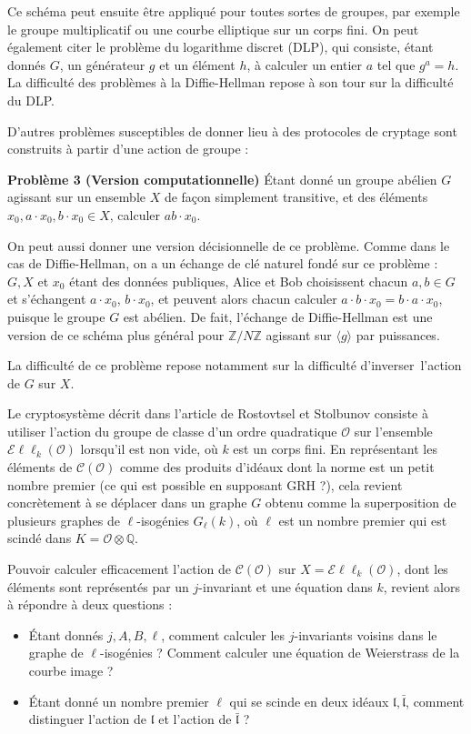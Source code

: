 \documentclass[11pt,a4paper]{article}
\newcommand{\Z}{\mathbb{Z}}
\newcommand{\Q}{\mathbb{Q}}
\renewcommand{\O}{\mathcal{O}}
\newcommand{\Cl}{\mathcal{C}}
\newcommand{\Ell}{\mathcal{E}\ell\ell}
\renewcommand{\frak}{\mathfrak}
\theoremstyle{definition}
\begin{document}
Ce schéma peut ensuite être appliqué pour toutes sortes de groupes, par exemple le groupe multiplicatif ou une courbe elliptique sur un corps fini. On peut également citer le problème du logarithme discret (DLP), qui consiste, étant donnés $G$, un générateur $g$ et un élément $h$, à calculer un entier $a$ tel que $g^a=h$. La difficulté des problèmes à la Diffie-Hellman repose à son tour sur la difficulté du DLP.

\vspace{5mm}

D'autres problèmes susceptibles de donner lieu à des protocoles de cryptage sont construits à partir d'une action de groupe :

\textbf{Problème 3 (Version computationnelle)} \'Etant donné un groupe abélien $G$ agissant sur un ensemble $X$ de façon simplement transitive, et des éléments $x_0, a\cdot x_0, b\cdot x_0\in X$, calculer $ab\cdot x_0$.

On peut aussi donner une version décisionnelle de ce problème. Comme dans le cas de Diffie-Hellman, on a un échange de clé naturel fondé sur ce problème : $G, X$ et $x_0$ étant des données publiques, Alice et Bob choisissent chacun $a,b\in G$ et s'échangent $a\cdot x_0$, $b\cdot x_0$, et peuvent alors chacun calculer $a\cdot b\cdot x_0=b\cdot a\cdot x_0$, puisque le groupe $G$ est abélien. De fait, l'échange de Diffie-Hellman est une version de ce schéma plus général pour $\Z/N\Z$ agissant sur $\langle g\rangle$ par puissances.

La difficulté de ce problème repose notamment sur la difficulté d'\og inverser\fg\ l'action de $G$ sur $X$.

\vspace{5mm}

Le cryptosystème décrit dans l'article de Rostovtsel et Stolbunov consiste à utiliser l'action du groupe de classe d'un ordre quadratique $\O$ sur l'ensemble $\Ell_k(\O)$ lorsqu'il est non vide, où $k$ est un corps fini. En représentant les éléments de $\Cl(\O)$ comme des produits d'idéaux dont la norme est un petit nombre premier (ce qui est possible en supposant GRH ?), cela revient concrètement à se déplacer dans un graphe $G$ obtenu comme la superposition de plusieurs graphes de $\ell$-isogénies $G_\ell(k)$, où $\ell$ est un nombre premier qui est scindé dans $K=\O\otimes\Q$.

Pouvoir calculer efficacement l'action de $\Cl(\O)$ sur $X=\Ell_k(\O)$, dont les éléments sont représentés par un $j$-invariant et une équation dans $k$, revient alors à répondre à deux questions :
\begin{itemize}
\item \'Etant donnés $j,A,B,\ell$, comment calculer les $j$-invariants voisins dans le graphe de $\ell$-isogénies ? Comment calculer une équation de Weierstrass de la courbe image ?
\item \'Etant donné un nombre premier $\ell$ qui se scinde en deux idéaux $\frak l,\bar{\frak l}$, comment distinguer l'action de $\frak l$ et l'action de $\bar{\frak l}$ ?
\end{itemize}
\end{document}
